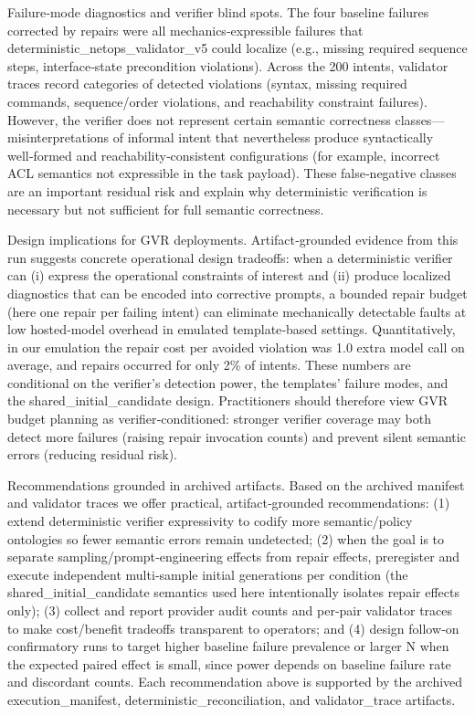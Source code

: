 \documentclass[conference]{IEEEtran}
\begin{document}
Failure‑mode diagnostics and verifier blind spots. The four baseline failures corrected by repairs were all mechanics‑expressible failures that deterministic\_netops\_validator\_v5 could localize (e.g., missing required sequence steps, interface‑state precondition violations). Across the 200 intents, validator traces record categories of detected violations (syntax, missing required commands, sequence/order violations, and reachability constraint failures). However, the verifier does not represent certain semantic correctness classes---misinterpretations of informal intent that nevertheless produce syntactically well‑formed and reachability‑consistent configurations (for example, incorrect ACL semantics not expressible in the task payload). These false‑negative classes are an important residual risk and explain why deterministic verification is necessary but not sufficient for full semantic correctness.

Design implications for GVR deployments. Artifact‑grounded evidence from this run suggests concrete operational design tradeoffs: when a deterministic verifier can (i) express the operational constraints of interest and (ii) produce localized diagnostics that can be encoded into corrective prompts, a bounded repair budget (here one repair per failing intent) can eliminate mechanically detectable faults at low hosted‑model overhead in emulated template‑based settings. Quantitatively, in our emulation the repair cost per avoided violation was 1.0 extra model call on average, and repairs occurred for only 2\% of intents. These numbers are conditional on the verifier's detection power, the templates' failure modes, and the shared\_initial\_candidate design. Practitioners should therefore view GVR budget planning as verifier‑conditioned: stronger verifier coverage may both detect more failures (raising repair invocation counts) and prevent silent semantic errors (reducing residual risk).

Recommendations grounded in archived artifacts. Based on the archived manifest and validator traces we offer practical, artifact‑grounded recommendations: (1) extend deterministic verifier expressivity to codify more semantic/policy ontologies so fewer semantic errors remain undetected; (2) when the goal is to separate sampling/prompt‑engineering effects from repair effects, preregister and execute independent multi‑sample initial generations per condition (the shared\_initial\_candidate semantics used here intentionally isolates repair effects only); (3) collect and report provider audit counts and per‑pair validator traces to make cost/benefit tradeoffs transparent to operators; and (4) design follow‑on confirmatory runs to target higher baseline failure prevalence or larger N when the expected paired effect is small, since power depends on baseline failure rate and discordant counts. Each recommendation above is supported by the archived execution\_manifest, deterministic\_reconciliation, and validator\_trace artifacts.
\end{document}
